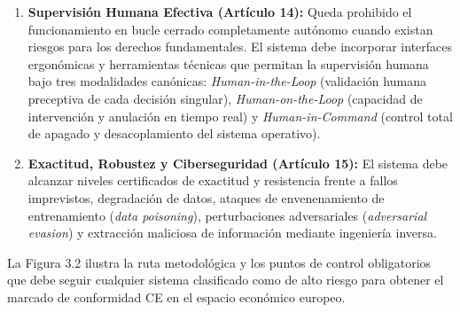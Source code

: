 \begin{enumerate}[label=\textbf{Art. \arabic*.}, leftmargin=3em]
    \item \textbf{Supervisión Humana Efectiva (Artículo 14):} Queda prohibido el funcionamiento en bucle cerrado completamente autónomo cuando existan riesgos para los derechos fundamentales. El sistema debe incorporar interfaces ergonómicas y herramientas técnicas que permitan la supervisión humana bajo tres modalidades canónicas: \textit{Human-in-the-Loop} (validación humana preceptiva de cada decisión singular), \textit{Human-on-the-Loop} (capacidad de intervención y anulación en tiempo real) y \textit{Human-in-Command} (control total de apagado y desacoplamiento del sistema operativo).
    \item \textbf{Exactitud, Robustez y Ciberseguridad (Artículo 15):} El sistema debe alcanzar niveles certificados de exactitud y resistencia frente a fallos imprevistos, degradación de datos, ataques de envenenamiento de entrenamiento (\textit{data poisoning}), perturbaciones adversariales (\textit{adversarial evasion}) y extracción maliciosa de información mediante ingeniería inversa.
\end{enumerate}

La Figura 3.2 ilustra la ruta metodológica y los puntos de control obligatorios que debe seguir cualquier sistema clasificado como de alto riesgo para obtener el marcado de conformidad CE en el espacio económico europeo.

